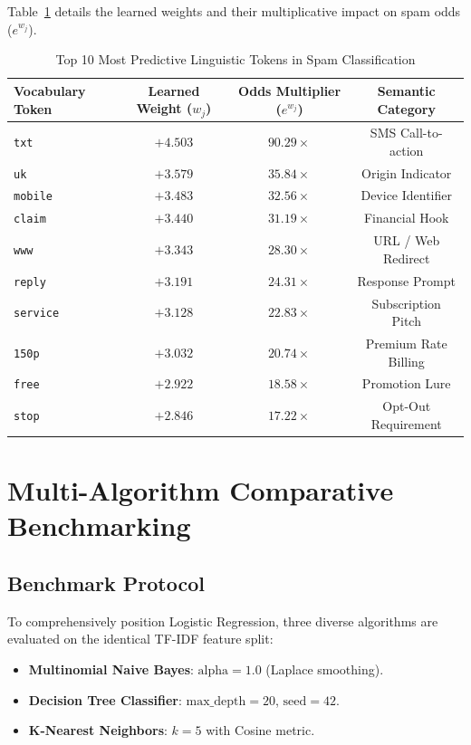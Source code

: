 \documentclass[12pt]{article}
\begin{document}
Table~\ref{tab:top_weights} details the learned weights and their multiplicative impact on spam odds ($e^{w_j}$).

\begin{table}[H]
\centering
\caption{Top 10 Most Predictive Linguistic Tokens in Spam Classification}
\label{tab:top_weights}
\vspace{0.2cm}
\begin{tabular}{lccc}
\toprule
\textbf{Vocabulary Token} & \textbf{Learned Weight ($w_j$)} & \textbf{Odds Multiplier ($e^{w_j}$)} & \textbf{Semantic Category} \\
\midrule
\texttt{txt}     & $+4.503$ & $90.29\times$ & SMS Call-to-action \\
\texttt{uk}      & $+3.579$ & $35.84\times$ & Origin Indicator \\
\texttt{mobile}  & $+3.483$ & $32.56\times$ & Device Identifier \\
\texttt{claim}   & $+3.440$ & $31.19\times$ & Financial Hook \\
\texttt{www}     & $+3.343$ & $28.30\times$ & URL / Web Redirect \\
\texttt{reply}   & $+3.191$ & $24.31\times$ & Response Prompt \\
\texttt{service} & $+3.128$ & $22.83\times$ & Subscription Pitch \\
\texttt{150p}    & $+3.032$ & $20.74\times$ & Premium Rate Billing \\
\texttt{free}    & $+2.922$ & $18.58\times$ & Promotion Lure \\
\texttt{stop}    & $+2.846$ & $17.22\times$ & Opt-Out Requirement \\
\bottomrule
\end{tabular}
\end{table}

\newpage
\section{Multi-Algorithm Comparative Benchmarking}

\subsection{Benchmark Protocol}
To comprehensively position Logistic Regression, three diverse algorithms are evaluated on the identical TF-IDF feature split:
\begin{itemize}
    \item \textbf{Multinomial Naive Bayes}: $\text{alpha} = 1.0$ (Laplace smoothing).
    \item \textbf{Decision Tree Classifier}: $\text{max\_depth} = 20$, $\text{seed} = 42$.
    \item \textbf{K-Nearest Neighbors}: $k = 5$ with Cosine metric.
\end{itemize}
\end{document}
